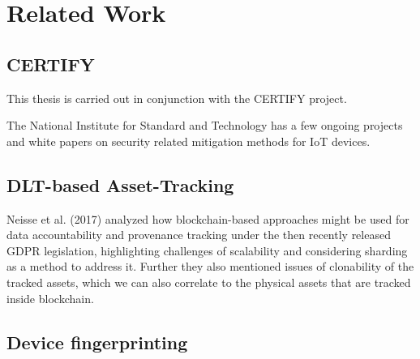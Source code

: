 \chapter{Related Work}


\section{CERTIFY}

This thesis is carried out in conjunction with the CERTIFY project.

The National Institute for Standard and Technology has a few ongoing projects and white papers on security related
mitigation methods for IoT devices.


\section{DLT-based Asset-Tracking}

Neisse et al. (2017) analyzed how blockchain-based approaches might be used for data accountability and provenance
tracking under the then recently released GDPR legislation, highlighting challenges of scalability and considering
sharding as a method to address it. \cite{neisse2017blockchain} Further they also mentioned issues of clonability of
the tracked assets, which we can also correlate to the physical assets that are tracked inside blockchain.

\section{Device fingerprinting}


